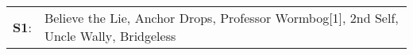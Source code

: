 \begin{supertabular}{p{0.03\textwidth}p{0.92\textwidth}}
 \textbf{S1}:  &  Believe the Lie\textsuperscript{}, \enspace Anchor Drops\textsuperscript{}, \enspace Professor Wormbog[1]\textsuperscript{}, \enspace 2nd Self\textsuperscript{}, \enspace Uncle Wally\textsuperscript{}, \enspace Bridgeless\textsuperscript{}  \enspace  \\
\end{supertabular}
